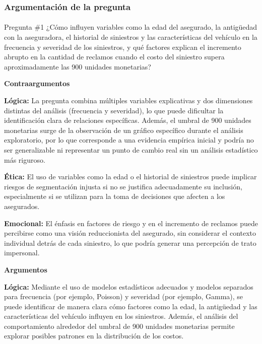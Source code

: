 \documentclass[
  spanish,
  11pt,
  letterpaper,
]{article}
\makeatletter
\let\oldparagraph\paragraph
\renewcommand{\paragraph}{
    \@ifstar
      \xxxParagraphStar
      \xxxParagraphNoStar
  }
\newcommand{\xxxParagraphStar}[1]{\oldparagraph*{#1}\mbox{}}
\newcommand{\xxxParagraphNoStar}[1]{\oldparagraph{#1}\mbox{}}
\makeatother
\begin{document}
\subsubsection{Argumentación de la
pregunta}\label{argumentaciuxf3n-de-la-pregunta}

\paragraph{Pregunta \#1 ¿Cómo influyen variables como la edad del
asegurado, la antigüedad con la aseguradora, el historial de siniestros
y las características del vehículo en la frecuencia y severidad de los
siniestros, y qué factores explican el incremento abrupto en la cantidad
de reclamos cuando el costo del siniestro supera aproximadamente las 900
unidades
monetarias?}\label{pregunta-1-cuxf3mo-influyen-variables-como-la-edad-del-asegurado-la-antiguxfcedad-con-la-aseguradora-el-historial-de-siniestros-y-las-caracteruxedsticas-del-vehuxedculo-en-la-frecuencia-y-severidad-de-los-siniestros-y-quuxe9-factores-explican-el-incremento-abrupto-en-la-cantidad-de-reclamos-cuando-el-costo-del-siniestro-supera-aproximadamente-las-900-unidades-monetarias}

\textbf{Contraargumentos}

\textbf{Lógica:} La pregunta combina múltiples variables explicativas y
dos dimensiones distintas del análisis (frecuencia y severidad), lo que
puede dificultar la identificación clara de relaciones específicas.
Además, el umbral de 900 unidades monetarias surge de la observación de
un gráfico específico durante el análisis exploratorio, por lo que
corresponde a una evidencia empírica inicial y podría no ser
generalizable ni representar un punto de cambio real sin un análisis
estadístico más riguroso.

\textbf{Ética:} El uso de variables como la edad o el historial de
siniestros puede implicar riesgos de segmentación injusta si no se
justifica adecuadamente su inclusión, especialmente si se utilizan para
la toma de decisiones que afecten a los asegurados.

\textbf{Emocional:} El énfasis en factores de riesgo y en el incremento
de reclamos puede percibirse como una visión reduccionista del
asegurado, sin considerar el contexto individual detrás de cada
siniestro, lo que podría generar una percepción de trato impersonal.

\textbf{Argumentos}

\textbf{Lógica:} Mediante el uso de modelos estadísticos adecuados y
modelos separados para frecuencia (por ejemplo, Poisson) y severidad
(por ejemplo, Gamma), se puede identificar de manera clara cómo factores
como la edad, la antigüedad y las características del vehículo influyen
en los siniestros. Además, el análisis del comportamiento alrededor del
umbral de 900 unidades monetarias permite explorar posibles patrones en
la distribución de los costos.
\end{document}

